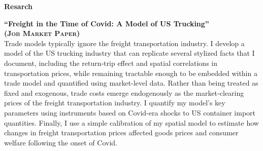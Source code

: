 \documentclass[10pt, oneside]{article}
\makeatletter
\newlength\tdima
\newcommand\tabfill[1]{%
      \setlength\tdima{\linewidth}%
      \addtolength\tdima{\@totalleftmargin}%
      \addtolength\tdima{-\dimen\@curtab}%
      \parbox[t]{\tdima}{#1\ifhmode\strut\fi}}
\newcommand\mytabs{\hspace*{1cm}\=\hspace{1cm}\=\hspace{1cm}\=\hspace{1cm}\=\hspace{1cm}\=\hspace{1cm}\=\hspace{1cm}\=\hspace{1cm}\=\hspace{1cm}\=\hspace{1cm}}
\newenvironment{mysec}[1][\mytabs]
  {\begin{tabbing}#1\kill\ignorespaces}
  {\end{tabbing}}
\makeatother
\begin{document}


\begin{minipage}[t]{0.1\linewidth}
\textbf{Resarch}
\end{minipage}\hspace{0.05\linewidth}
\begin{minipage}[t]{0.8\linewidth}
\textbf{``Freight in the Time of Covid: A Model of US Trucking''\\ 
(\textsc{Job Market Paper})}\\ 

Trade models typically ignore the freight transportation industry. I develop a model of the US trucking industry that can replicate several stylized facts that I document, including the return-trip effect and spatial correlations in transportation prices, while remaining tractable enough to be embedded within a trade model and quantified using market-level data. Rather than being treated as fixed and exogenous, trade costs emerge endogenously as the market-clearing prices of the freight transportation industry. I quantify my model's key parameters using instruments based on Covid-era shocks to US container import quantities. Finally, I use a simple calibration of my spatial model to estimate how changes in freight transportation prices affected goods prices and consumer welfare following the onset of Covid.

\end{minipage}\vspace{5mm}
\end{document}
